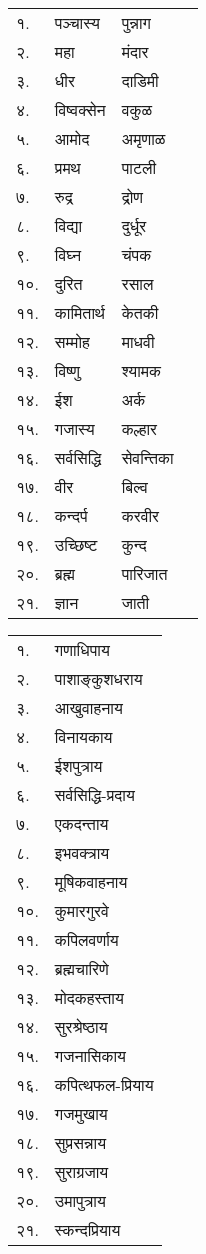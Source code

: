 \begin{center}
\begin{longtable}{ll@{-गणपतये नमः — }ll@{-पुष्पं समर्पयामि}}
    १. & पञ्चास्य & पुन्नाग&\\
    २. & महा & मंदार&\\
    ३. & धीर &  दाडिमी&\\
    ४. & विष्वक्सेन &  वकुळ&\\
    ५. & आमोद &  अमृणाळ&\\
    ६. & प्रमथ &  पाटली&\\
    ७. & रुद्र &  द्रोण&\\
    ८. & विद्या &  दुर्धूर&\\
    ९. & विघ्न &  चंपक&\\
    १०. & दुरित &  रसाल&\\
    ११. & कामितार्थ &  केतकी&\\
    १२. & सम्मोह &  माधवी&\\
    १३. & विष्णु &  श्यामक&\\
    १४. & ईश &  अर्क&\\
    १५. & गजास्य &  कल्हार&\\
    १६. & सर्वसिद्धि &  सेवन्तिका&\\
    १७. & वीर &  बिल्व&\\
    १८. & कन्दर्प &  करवीर&\\
    १९. & उच्छिष्ट &  कुन्द&\\
    २०. & ब्रह्म &  पारिजात&\\
    २१. & ज्ञान &  जाती&\\
\end{longtable}
    

\begin{longtable}{ll@{~नमः — दूर्वायुग्मं समर्पयामि।}}
    १. & गणाधिपाय \\
    २. & पाशाङ्कुशधराय \\
    ३. & आखुवाहनाय \\
    ४. & विनायकाय \\
    ५. & ईशपुत्राय \\
    ६. & सर्वसिद्धि-प्रदाय \\
    ७. & एकदन्ताय \\
    ८. & इभवक्त्राय \\
    ९. & मूषिकवाहनाय \\
    १०. & कुमारगुरवे \\
    ११. & कपिलवर्णाय \\
    १२. & ब्रह्मचारिणे \\
    १३. & मोदकहस्ताय \\
    १४. & सुरश्रेष्ठाय \\
    १५. & गजनासिकाय \\
    १६. & कपित्थफल-प्रियाय \\
    १७. & गजमुखाय \\
    १८. & सुप्रसन्नाय \\
    १९. & सुराग्रजाय \\
    २०. & उमापुत्राय \\
    २१. & स्कन्दप्रियाय \\
\end{longtable}
    


\end{center}
